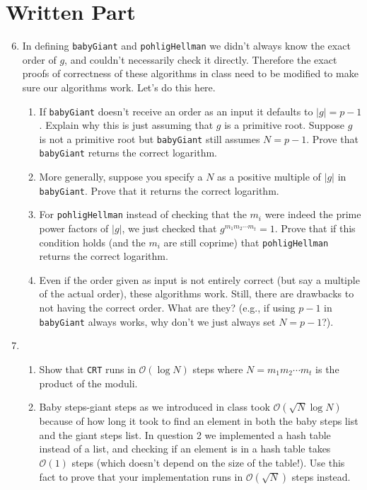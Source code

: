 \documentclass[11pt]{article}
\newcommand{\cO}{\mathcal{O}}
\begin{document}
\section*{Written Part}
\begin{enumerate}
  \setcounter{enumi}{5}
  \item{
  In defining \verb|babyGiant| and \verb|pohligHellman| we didn't always know the exact order of $g$, and couldn't necessarily check it directly.  Therefore the exact proofs of correctness of these algorithms in class need to be modified to make sure our algorithms work.  Let's do this here.
  \begin{enumerate}
    \item{
    If \verb|babyGiant| doesn't receive an order as an input it defaults to $|g| = p-1$.  Explain why this is just assuming that $g$ is a primitive root.  Suppose $g$ is not a primitive root but \verb|babyGiant| still assumes $N=p-1$.  Prove that \verb|babyGiant| returns the correct logarithm.
    }
    \item{
    More generally, suppose you specify a $N$ as a positive multiple of $|g|$ in \verb|babyGiant|.  Prove that it returns the correct logarithm.
    }
    \item{
    For \verb|pohligHellman| instead of checking that the $m_i$ were indeed the prime power factors of $|g|$, we just checked that $g^{m_1m_2\cdots m_t} = 1$.  Prove that if this condition holds (and the $m_i$ are still coprime) that \verb|pohligHellman| returns the correct logarithm.
    }
    \item{
    Even if the order given as input is not entirely correct (but say a multiple of the actual order), these algorithms work.  Still, there are drawbacks to not having the correct order.  What are they?  (e.g., if using $p-1$ in \verb|babyGiant| always works, why don't we just always set $N=p-1$?).
    }
  \end{enumerate}
  }
  \item{
  \begin{enumerate}
    \item{
    Show that \verb|CRT| runs in $\cO(\log N)$ steps where $N = m_1m_2\cdots m_t$ is the product of the moduli.
    }
    \item{
    Baby steps-giant steps as we introduced in class took $\cO(\sqrt N\log N)$ because of how long it took to find an element in both the baby steps list and the giant steps list.  In question 2 we implemented a hash table instead of a list, and checking if an element is in a hash table takes $\cO(1)$ steps (which doesn't depend on the size of the table!).  Use this fact to prove that your implementation runs in $\cO(\sqrt N)$ steps instead.
}
\end{enumerate}}
\end{enumerate}
\end{document}

